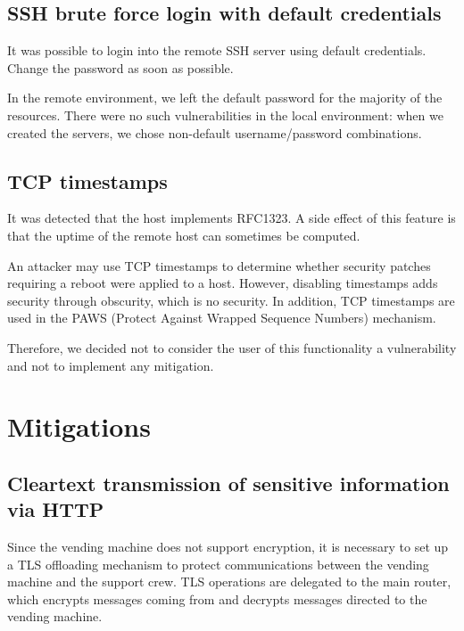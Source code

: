 \documentclass{homework}
\begin{document}
    \subsection{SSH brute force login with default credentials}
    \begin{displayquote}
        It was possible to login into the remote SSH server using default credentials.
       \textelp{}
       Change the password as soon as possible.
    \end{displayquote}
    In the remote environment, we left the default password for the majority of the resources.
    There were no such vulnerabilities in the local environment: when we created the servers, we chose non-default username/password combinations.
    
    \subsection{TCP timestamps}
    \begin{displayquote}
        It was detected that the host implements RFC1323.
        \textelp{}
        A side effect of this feature is that the uptime of the remote host can sometimes be computed.
    \end{displayquote}
    
    An attacker may use TCP timestamps to determine whether security patches requiring a reboot were applied to a host.
    However, disabling timestamps adds security through obscurity, which is no security. 
    In addition, TCP timestamps are used in the PAWS (Protect Against Wrapped Sequence Numbers) mechanism.
    
    Therefore, we decided not to consider the user of this functionality a vulnerability and not to implement any mitigation.
    
    
    \section{Mitigations}
    \subsection{Cleartext transmission of sensitive information via HTTP}\label{sec:http-mitigation}
    Since the vending machine does not support encryption, it is necessary to set up a TLS offloading mechanism to protect communications between the vending machine and the support crew.
    TLS operations are delegated to the main router, which encrypts messages coming from and decrypts messages directed to the vending machine. 
    
\end{document}
